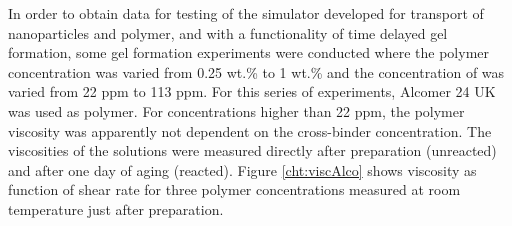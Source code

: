 \documentclass[nanomaterials,article,submit,moreauthors,pdftex]{Definitions/mdpi}
\begin{document}
In order to obtain data for testing of the simulator developed for transport of nanoparticles and polymer, and with a functionality of time delayed gel formation, some gel formation experiments were conducted where the polymer concentration was varied from 0.25 wt.\% to 1 wt.\% and the concentration of  was varied from 22 ppm to 113 ppm. For this series of experiments, Alcomer 24 UK was used as polymer. For concentrations higher than 22 ppm, the polymer viscosity was apparently not dependent on the cross-binder concentration. The viscosities of the solutions were measured directly after preparation (unreacted) and after one day of aging (reacted). Figure \ref{cht:viscAlco} shows viscosity as function of shear rate for three polymer concentrations measured at room temperature just after preparation.
\end{document}
